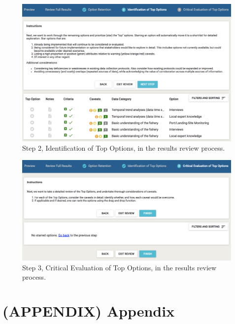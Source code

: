 \documentclass[11pt,]{book}
\begin{document}
\begin{figure}

{\centering \includegraphics[width=0.95\linewidth]{images/review-step-2} 

}

\caption{Step 2, Identification of Top Options, in the results review process.}\label{fig:review-step-2}
\end{figure}

\begin{figure}

{\centering \includegraphics[width=0.95\linewidth]{images/review-step-3} 

}

\caption{Step 3, Critical Evaluation of Top Options, in the results review process.}\label{fig:review-step-3}
\end{figure}

\hypertarget{appendix-appendix}{%
\chapter*{(APPENDIX) Appendix}\label{appendix-appendix}}
\end{document}
